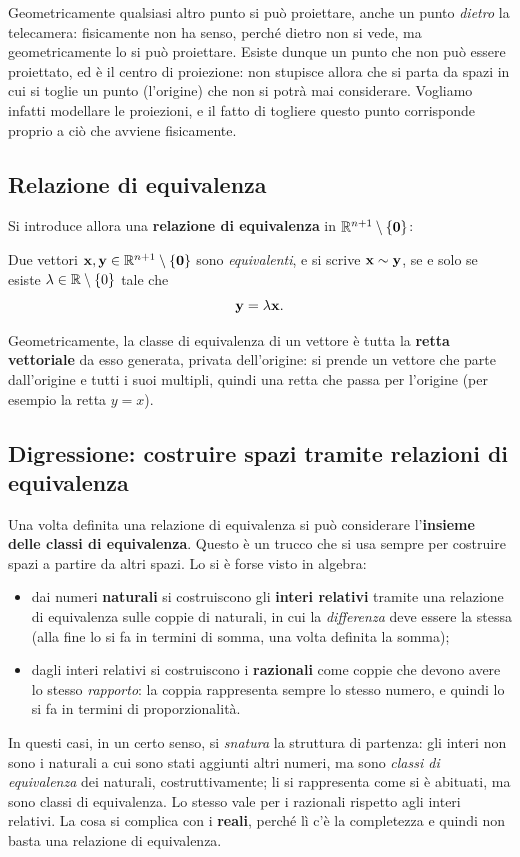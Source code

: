Geometricamente qualsiasi altro punto si può proiettare, anche un punto \emph{dietro} la telecamera: fisicamente non ha senso, perché dietro non si vede, ma geometricamente lo si può proiettare. Esiste dunque un punto che non può essere proiettato, ed è il centro di proiezione: non stupisce allora che si parta da spazi in cui si toglie un punto (l'origine) che non si potrà mai considerare. Vogliamo infatti modellare le proiezioni, e il fatto di togliere questo punto corrisponde proprio a ciò che avviene fisicamente.

\subsection{Relazione di equivalenza}

Si introduce allora una \textbf{relazione di equivalenza} in $\mathbb{R}^{n+1}\setminus\{\mathbf{0}\}$:

\begin{definizione}
Due vettori $\mathbf{x},\mathbf{y}\in\mathbb{R}^{n+1}\setminus\{\mathbf{0}\}$ sono \emph{equivalenti}, e si scrive $\mathbf{x}\sim\mathbf{y}$, se e solo se esiste $\lambda\in\mathbb{R}\setminus\{0\}$ tale che
\[
  \mathbf{y} = \lambda\mathbf{x} .
\]
\end{definizione}

Geometricamente, la classe di equivalenza di un vettore è tutta la \textbf{retta vettoriale} da esso generata, privata dell'origine: si prende un vettore che parte dall'origine e tutti i suoi multipli, quindi una retta che passa per l'origine (per esempio la retta $y=x$).

\subsection{Digressione: costruire spazi tramite relazioni di equivalenza}

Una volta definita una relazione di equivalenza si può considerare l'\textbf{insieme delle classi di equivalenza}. Questo è un trucco che si usa sempre per costruire spazi a partire da altri spazi. Lo si è forse visto in algebra:
\begin{itemize}
  \item dai numeri \textbf{naturali} si costruiscono gli \textbf{interi relativi} tramite una relazione di equivalenza sulle coppie di naturali, in cui la \emph{differenza} deve essere la stessa (alla fine lo si fa in termini di somma, una volta definita la somma);
  \item dagli interi relativi si costruiscono i \textbf{razionali} come coppie che devono avere lo stesso \emph{rapporto}: la coppia rappresenta sempre lo stesso numero, e quindi lo si fa in termini di proporzionalità.
\end{itemize}
In questi casi, in un certo senso, si \emph{snatura} la struttura di partenza: gli interi non sono i naturali a cui sono stati aggiunti altri numeri, ma sono \emph{classi di equivalenza} dei naturali, costruttivamente; li si rappresenta come si è abituati, ma sono classi di equivalenza. Lo stesso vale per i razionali rispetto agli interi relativi. La cosa si complica con i \textbf{reali}, perché lì c'è la completezza e quindi non basta una relazione di equivalenza.

